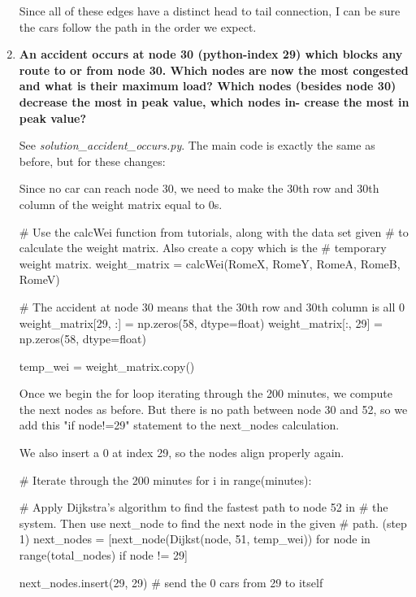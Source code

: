 \documentclass[paper=a4, fontsize=12pt]{scrartcl} %
\numberwithin{equation}{section}       %
\numberwithin{figure}{section}         %
\numberwithin{table}{section}          %
\begin{document}
\begin{enumerate}
\begin{figure}[h]
\end{figure}

Since all of these edges have a distinct head to tail connection, I can be sure the cars follow the path in the order we expect.


\item \textbf{An accident occurs at node 30 (python-index 29) which blocks any route to or from node 30. Which nodes are now the most congested and what is their maximum load? Which nodes (besides node 30) decrease the most in peak value, which nodes in- crease the most in peak value?}

See \textit{solution\_accident\_occurs.py}. The main code is exactly the same as before, but for these changes:

Since no car can reach node 30, we need to make the 30th row and 30th column of the weight matrix equal to 0s. 

\begin{python}
# Use the calcWei function from tutorials, along with the data set given
# to calculate the weight matrix. Also create a copy which is the
# temporary weight matrix.
weight_matrix = calcWei(RomeX, RomeY, RomeA, RomeB, RomeV)

# The accident at node 30 means that the 30th row and 30th column is all 0
weight_matrix[29, :] = np.zeros(58, dtype=float)
weight_matrix[:, 29] = np.zeros(58, dtype=float)

temp_wei = weight_matrix.copy()
\end{python}

Once we begin the for loop iterating through the 200 minutes, we compute the next nodes as before. But there is no path between node 30 and 52, so we add this "if node!=29" statement to the next\_nodes calculation.

We also insert a 0 at index 29, so the nodes align properly again.

\begin{python}
# Iterate through the 200 minutes
for i in range(minutes):

    # Apply Dijkstra's algorithm to find the fastest path to node 52 in
    # the system. Then use next_node to find the next node in the given
    # path. (step 1)
    next_nodes = [next_node(Dijkst(node, 51, temp_wei))
                  for node in range(total_nodes) if node != 29]

    next_nodes.insert(29, 29)  # send the 0 cars from 29 to itself
\end{python}


\end{enumerate}
\end{document}
